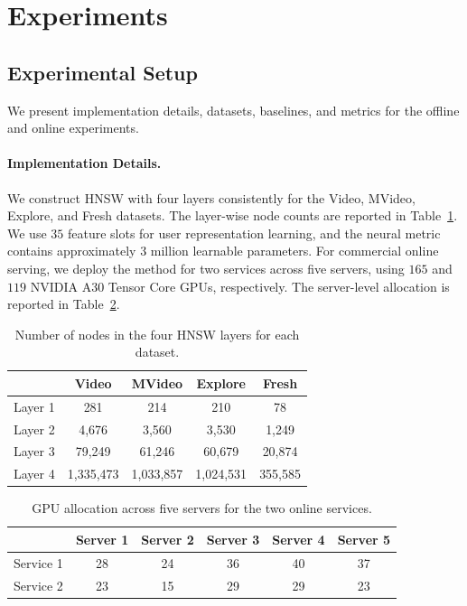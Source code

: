\FloatBarrier
\section{Experiments}\label{gmpgr:sec:exp}

\subsection{Experimental Setup}

We present implementation details, datasets, baselines, and metrics for the offline and online experiments.

\paragraph{Implementation Details.}
We construct HNSW with four layers consistently for the Video, MVideo, Explore, and Fresh datasets. The layer-wise node counts are reported in Table~\ref{gmpgr:tab:nodes}. We use $35$ feature slots for user representation learning, and the neural metric contains approximately $3$ million learnable parameters. For commercial online serving, we deploy the method for two services across five servers, using $165$ and $119$ NVIDIA A30 Tensor Core GPUs, respectively. The server-level allocation is reported in Table~\ref{gmpgr:tab:gpu}.

\begin{table}[t]
    \centering
    \caption{Number of nodes in the four HNSW layers for each dataset.}
    \label{gmpgr:tab:nodes}
    \begin{tabular}{c|cccc}
        \toprule
         & Video & MVideo & Explore & Fresh \\
        \midrule
        Layer 1 & 281 & 214 & 210 & 78 \\
        Layer 2 & 4,676 & 3,560 & 3,530 & 1,249 \\
        Layer 3 & 79,249 & 61,246 & 60,679 & 20,874 \\
        Layer 4 & 1,335,473 & 1,033,857 & 1,024,531 & 355,585 \\
        \bottomrule
    \end{tabular}
\end{table}

\begin{table}[t]
    \centering
    \caption{GPU allocation across five servers for the two online services.}
    \label{gmpgr:tab:gpu}
    \begin{tabular}{c|ccccc}
        \toprule
         & Server 1 & Server 2 & Server 3 & Server 4 & Server 5 \\
        \midrule
        Service 1 & 28 & 24 & 36 & 40 & 37 \\
        Service 2 & 23 & 15 & 29 & 29 & 23 \\
        \bottomrule
    \end{tabular}
\end{table}


